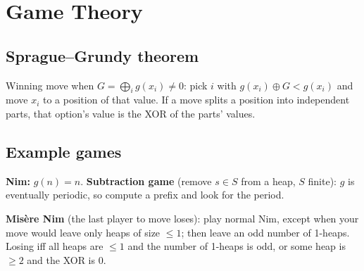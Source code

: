 


\section{Game Theory}
\subsection{Sprague--Grundy theorem}
Winning move when $G = \bigoplus_i g(x_i) \neq 0$: pick $i$ with
$g(x_i) \oplus G < g(x_i)$ and move $x_i$ to a position of that value.
If a move splits a position into independent parts, that option's value is
the XOR of the parts' values.

\subsection{Example games}
\textbf{Nim:} $g(n) = n$. 
\textbf{Subtraction game} (remove $s \in S$ from a heap,
$S$ finite): $g$ is eventually periodic, so compute a prefix and look for the period.

\textbf{Misère Nim} (the last player to move loses): play normal Nim, except when
your move would leave only heaps of size $\le 1$; then leave an odd number of
1-heaps. Losing iff all heaps are $\le 1$ and the number of 1-heaps is odd, or
some heap is $\ge 2$ and the XOR is $0$.

